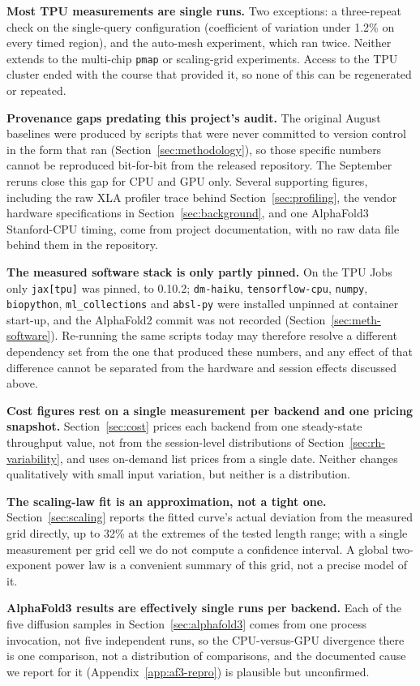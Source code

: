 \textbf{Most TPU measurements are single runs.} Two exceptions: a
three-repeat check on the single-query configuration (coefficient of
variation under 1.2\% on every timed region), and the auto-mesh
experiment, which ran twice. Neither extends to the multi-chip
\texttt{pmap} or scaling-grid experiments. Access to the
TPU cluster ended with the course that provided it, so none of this
can be regenerated or repeated.

\textbf{Provenance gaps predating this project's audit.} The original
August baselines were produced by scripts that were never committed
to version control in the form that ran (Section~\ref{sec:methodology}),
so those specific numbers cannot be reproduced bit-for-bit from the
released repository. The September reruns close this gap for CPU and
GPU only. Several supporting figures, including the raw XLA profiler
trace behind Section~\ref{sec:profiling}, the vendor hardware
specifications in Section~\ref{sec:background}, and one AlphaFold3
Stanford-CPU timing, come from project documentation, with no raw data
file behind them in the repository.

\textbf{The measured software stack is only partly pinned.} On the TPU
Jobs only \texttt{jax[tpu]} was pinned, to 0.10.2;
\texttt{dm-haiku}, \texttt{tensorflow-cpu}, \texttt{numpy},
\texttt{biopython}, \texttt{ml\_collections} and \texttt{absl-py} were
installed unpinned at container start-up, and the AlphaFold2 commit was
not recorded (Section~\ref{sec:meth-software}). Re-running the same
scripts today may therefore resolve a different dependency set from the
one that produced these numbers, and any effect of that difference
cannot be separated from the hardware and session effects discussed
above.

\textbf{Cost figures rest on a single measurement per backend and one
pricing snapshot.} Section~\ref{sec:cost} prices each backend
from one steady-state throughput value, not from the session-level
distributions of Section~\ref{sec:rh-variability}, and uses on-demand
list prices from a single date. Neither changes qualitatively with
small input variation, but neither is a distribution.

\textbf{The scaling-law fit is an approximation, not a tight one.}
Section~\ref{sec:scaling} reports the fitted curve's actual deviation
from the measured grid directly, up to 32\% at the extremes of the
tested length range; with a single measurement per grid cell we do not
compute a confidence interval. A global two-exponent power law is a
convenient summary of this grid, not a precise model of it.

\textbf{AlphaFold3 results are effectively single runs per backend.}
Each of the five diffusion samples in Section~\ref{sec:alphafold3}
comes from one process invocation, not five independent runs, so the
CPU-versus-GPU divergence there is one comparison, not a distribution
of comparisons, and the documented cause we report for it
(Appendix~\ref{app:af3-repro}) is plausible but unconfirmed.
